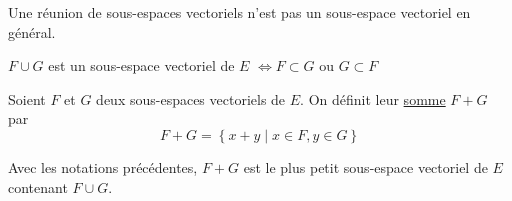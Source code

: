 \begin{rmk}
	Une réunion de sous-espaces vectoriels n'est pas un sous-espace vectoriel en général.
\end{rmk}

\begin{exo}
	$F \cup G$ est un sous-espace vectoriel de $E$
	$\iff F \subset G$ ou $G \subset F$
\end{exo}

\begin{defn}
	Soient $F$ et $G$ deux sous-espaces vectoriels de $E$. On définit leur \underline{somme} $F+G$ par \[
		F+G = \left\{ x + y  \mid x \in F, y \in G \right\} 
	\]
\end{defn}

\begin{prop}
	Avec les notations précédentes, $F+G$ est le plus petit sous-espace vectoriel de $E$ contenant $F \cup G$.
\end{prop}


